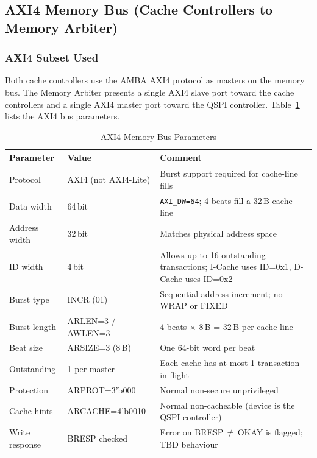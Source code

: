 \subsection{AXI4 Memory Bus (Cache Controllers to Memory Arbiter)}

\subsubsection{AXI4 Subset Used}

Both cache controllers use the AMBA AXI4 protocol as masters on the
memory bus.
The Memory Arbiter presents a single AXI4 slave port toward the cache
controllers and a single AXI4 master port toward the QSPI controller.
Table~\ref{tab:asAxi4Params} lists the AXI4 bus parameters.

\begin{table}[H]
\caption{AXI4 Memory Bus Parameters}
\label{tab:asAxi4Params}
\centering
\begin{tabularx}{\textwidth}{|l |l |X|}
  \hline
  Parameter & Value & Comment \\
  \hline
  \hline
  Protocol        & AXI4 (not AXI4-Lite)       & Burst support required for cache-line fills \\
  \hline
  Data width      & 64\,bit                     & \texttt{AXI\_DW=64}; 4 beats fill a 32\,B cache line \\
  \hline
  Address width   & 32\,bit                     & Matches physical address space \\
  \hline
  ID width        & 4\,bit                      & Allows up to 16 outstanding transactions; I-Cache uses ID=0x1, D-Cache uses ID=0x2 \\
  \hline
  Burst type      & INCR (01)                   & Sequential address increment; no WRAP or FIXED \\
  \hline
  Burst length    & ARLEN=3 / AWLEN=3           & 4 beats $\times$ 8\,B = 32\,B per cache line \\
  \hline
  Beat size       & ARSIZE=3 (8\,B)             & One 64-bit word per beat \\
  \hline
  Outstanding     & 1 per master                & Each cache has at most 1 transaction in flight \\
  \hline
  Protection      & ARPROT=3'b000               & Normal non-secure unprivileged \\
  \hline
  Cache hints     & ARCACHE=4'b0010             & Normal non-cacheable (device is the QSPI controller) \\
  \hline
  Write response  & BRESP checked               & Error on BRESP\,$\neq$\,OKAY is flagged; TBD behaviour \\
  \hline
\end{tabularx}
\end{table}

